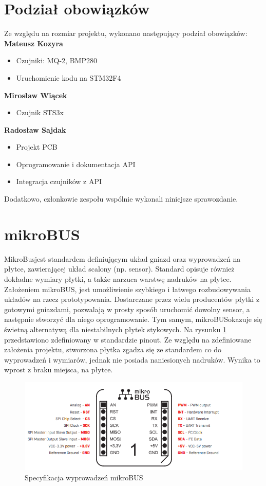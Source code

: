 \section{Podział obowiązków}
Ze względu na rozmiar projektu, wykonano następujący podział obowiązków:\newline
\textbf{Mateusz Kozyra}
\begin{itemize}
    \item Czujniki: MQ-2, BMP280
    \item Uruchomienie kodu na STM32F4
\end{itemize}
\textbf{Mirosław Wiącek}
\begin{itemize}
    \item Czujnik STS3x
\end{itemize}
\textbf{Radosław Sajdak}
\begin{itemize}
    \item Projekt PCB
    \item Oprogramowanie i dokumentacja API
    \item Integracja czujników z API
\end{itemize}
Dodatkowo, członkowie zespołu wspólnie wykonali niniejsze sprawozdanie.

\section{mikroBUS\texttrademark}
MikroBus\texttrademark jest standardem definiującym układ gniazd oraz wyprowadzeń na płytce, zawierającej układ scalony (np. sensor). Standard opisuje również dokładne wymiary płytki, a także narzuca warstwę nadruków na płytce. Założeniem mikroBUS\texttrademark, jest umożliwienie szybkiego i łatwego rozbudowywania układów na rzecz prototypowania. Dostarczane przez wielu producentów płytki z gotowymi gniazdami, pozwalają w prosty sposób uruchomić dowolny sensor, a następnie stworzyć dla niego oprogramowanie. Tym samym, mikroBUS\texttrademark okazuje się świetną alternatywą dla niestabilnych płytek stykowych. Na rysunku \ref{img:mikrobus_pinout} przedstawiono zdefiniowany w standardzie pinout. \newline
Ze względu na zdefiniowane założenia projektu, stworzona płytka zgadza się ze standardem co do wyprowadzeń i wymiarów, jednak nie posiada naniesionych nadruków. Wynika to wprost z braku miejsca, na płytce.

\begin{figure}[H]
    \centering
    \includegraphics[width=12cm]{Graphics/mikrobus_pinout.png}
    \caption{Specyfikacja wyprowadzeń mikroBUS\texttrademark \cite{mikrobus_specification}}
    \label{img:mikrobus_pinout}
\end{figure}


